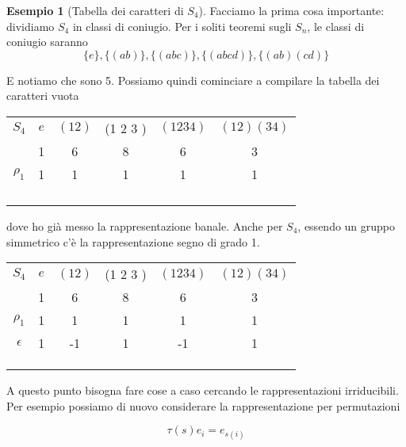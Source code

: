 \documentclass[11pt]{article}
\theoremstyle{plain}
\theoremstyle{definition}
\newtheorem{exmp}{Esempio}[section]
\theoremstyle{remark}
\begin{document}
\begin{exmp}[Tabella dei caratteri di $S_4$]
Facciamo la prima cosa importante: dividiamo $S_4$ in classi di coniugio. Per i soliti teoremi sugli $S_n$, le classi di coniugio saranno
\[\{e\}, \{(a b)\}, \{(a b c)\}, \{(a b c d)\}, \{(a b)(c d)\}\]

E notiamo che sono 5. Possiamo quindi cominciare a compilare la tabella dei caratteri vuota



\begin{table}[!ht]
\centering
\begin{tabular}{|c|c|c|c|c|c|}
\hline
$S_4$  & $e$ & $(1 2)$ & (1 2 3 ) & $(1 2 3 4)$ & $(1 2)(3 4)$ \\
 & 1 & 6 & 8 & 6 & 3 \\
\hline
 $\rho_1$ & 1 & 1  & 1 & 1 & 1\\
\hline
& &  & & & \\
\hline
& &  & & & \\
\hline
& &  & & & \\
\hline
& &  & & & \\
\hline
\end{tabular}
\end{table}


dove ho già messo la rappresentazione banale. Anche per $S_4$, essendo un gruppo simmetrico c'è la rappresentazione segno di grado 1.




\begin{table}[!ht]
\centering
\begin{tabular}{|c|c|c|c|c|c|}
\hline
$S_4$  & $e$ & $(1 2)$ & (1 2 3 ) & $(1 2 3 4)$ & $(1 2)(3 4)$ \\
 & 1 & 6 & 8 & 6 & 3 \\
\hline
 $\rho_1$ & 1 & 1  & 1 & 1 & 1\\
\hline
$\epsilon$ & 1  & -1 & 1 & -1 & 1 \\
\hline
& &  & & & \\
\hline
& &  & & & \\
\hline
& &  & & & \\
\hline
\end{tabular}
\end{table}


A questo punto bisogna fare cose a caso cercando le rappresentazioni irriducibili. Per esempio possiamo di nuovo considerare la rappresentazione per permutazioni



\[ \tau(s) e_i = e_{s(i)}\]



\end{exmp}
\end{document}
